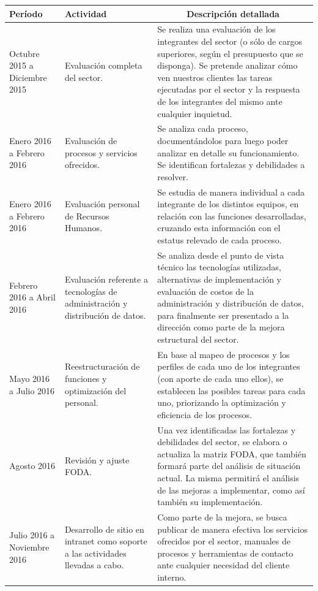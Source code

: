 \begin{center}
\begin{longtable}{|>{\centering\arraybackslash}m{3cm}|>{\centering\arraybackslash}m{3cm}|m{7cm}|}
\hline
\textbf{Período}
&
\textbf{Actividad}
&
\multicolumn{1}{c|}{\textbf{Descripción detallada}}
\\
\hline
\endhead
\label{estrategias}
Octubre 2015 a Diciembre 2015
&
Evaluación completa del sector.
&
Se realiza una evaluación de los integrantes del sector (o sólo de cargos superiores, según el presupuesto que se disponga).
Se pretende analizar cómo ven nuestros clientes las tareas ejecutadas por el sector y la respuesta de los integrantes del mismo ante cualquier inquietud.
\\
\hline
Enero 2016 a Febrero 2016
&
Evaluación de procesos y servicios ofrecidos.
&
Se analiza cada proceso, documentándolos para luego poder analizar en detalle su funcionamiento. Se identifican fortalezas y debilidades a resolver.
\\
\hline
Enero 2016 a Febrero 2016
&
Evaluación personal de Recursos Humanos.
&
Se estudia de manera individual a cada integrante de los distintos equipos, en relación con las funciones desarrolladas, cruzando esta información con el estatus relevado de cada proceso.
\\
\hline
Febrero 2016 a Abril 2016
&
Evaluación referente a tecnologías de administración y distribución de datos.
&
Se analiza desde el punto de vista técnico las tecnologías utilizadas, alternativas de implementación y evaluación de costos de la administración y distribución de datos, para finalmente ser presentado a la dirección como parte de la mejora estructural del sector.
\\
\hline
Mayo 2016 a Julio 2016
&
Reestructuración de funciones y optimización del personal.
&
En base al mapeo de procesos y los perfiles de cada uno de los integrantes (con aporte de cada uno ellos), se establecen las posibles tareas para cada uno, priorizando la optimización y eficiencia de los procesos.
\\
\hline
Agosto 2016
&
Revisión y ajuste FODA.
&
Una vez identificadas las fortalezas y debilidades del sector, se  elabora o actualiza la matriz FODA, que también formará parte del análisis de situación actual. La misma permitirá el análisis de las mejoras a implementar, como así también su implementación.
\\
\hline
Julio 2016 a Noviembre 2016
&
Desarrollo de sitio en intranet como soporte a las actividades llevadas a cabo.
&
Como parte de la mejora, se busca publicar de manera efectiva los servicios ofrecidos por el sector, manuales de procesos y herramientas de contacto ante cualquier necesidad del cliente interno.
\\

\end{longtable}
\end{center}
